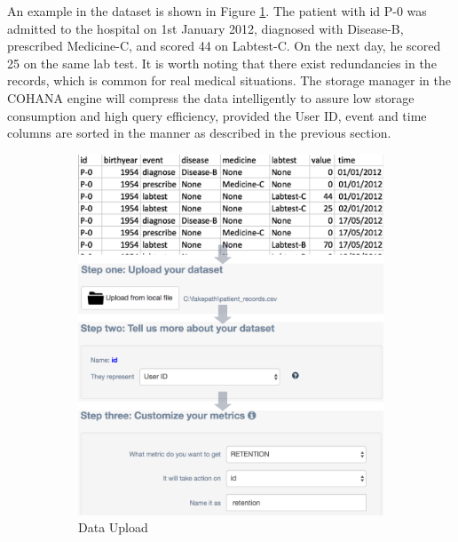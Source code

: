 \documentclass[10pt,conference,letterpaper]{IEEEtran}
\begin{document}
An example in the dataset is shown in Figure \ref{fig:upload}. The patient with id P-0 was admitted to the hospital on 1st January 2012, diagnosed with Disease-B, prescribed Medicine-C, and scored 44 on Labtest-C. On the next day, he scored 25 on the same lab test. 
It is worth noting that there exist redundancies in the records, which is common for real medical situations. 
The storage manager in the COHANA engine will compress the data intelligently to assure low storage consumption and high query efficiency, provided the User ID, event and time columns are sorted in the manner as described in the previous section.


\begin{figure}
\begin{subfigure}{0.3\textwidth}
    \centering
    \includegraphics[width=0.9\linewidth]{upload_all_vertical.png}
    \caption{Data Upload}
    \label{fig:upload}
\end{subfigure}%
\begin{subfigure}{0.4\textwidth}
    \centering

\end{subfigure}
\end{figure}
\end{document}
